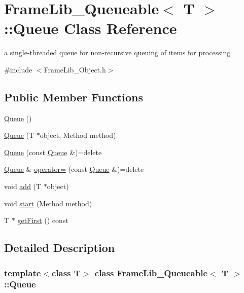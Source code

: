 \hypertarget{class_frame_lib___queueable_1_1_queue}{}\section{Frame\+Lib\+\_\+\+Queueable$<$ T $>$\+:\+:Queue Class Reference}
\label{class_frame_lib___queueable_1_1_queue}


a single-\/threaded queue for non-\/recursive queuing of items for processing  




{\ttfamily \#include $<$Frame\+Lib\+\_\+\+Object.\+h$>$}

\subsection*{Public Member Functions}
\begin{DoxyCompactItemize}
\item 
\hyperlink{class_frame_lib___queueable_1_1_queue_a5eb25b5751d5cc25331aa5e1b4fcb6ae}{Queue} ()
\item 
\hyperlink{class_frame_lib___queueable_1_1_queue_af701d261343c894ba4cde0aa8dd99bd1}{Queue} (T $\ast$object, Method method)
\item 
\hyperlink{class_frame_lib___queueable_1_1_queue_ae915c9e20e2c45cddb2fb2e502bae721}{Queue} (const \hyperlink{class_frame_lib___queueable_1_1_queue}{Queue} \&)=delete
\item 
\hyperlink{class_frame_lib___queueable_1_1_queue}{Queue} \& \hyperlink{class_frame_lib___queueable_1_1_queue_ad4185ad6feb21ba3cdc449274fc089db}{operator=} (const \hyperlink{class_frame_lib___queueable_1_1_queue}{Queue} \&)=delete
\item 
void \hyperlink{class_frame_lib___queueable_1_1_queue_ad53a3b731ae68fb92a3e0ea82687a1ce}{add} (T $\ast$object)
\item 
void \hyperlink{class_frame_lib___queueable_1_1_queue_a3fb4a73a39929ac3defbb98e3efdd363}{start} (Method method)
\item 
T $\ast$ \hyperlink{class_frame_lib___queueable_1_1_queue_a57e16be316a37b9b6d0d5cf7267e4d12}{get\+First} () const
\end{DoxyCompactItemize}


\subsection{Detailed Description}
\subsubsection*{template$<$class T$>$\newline
class Frame\+Lib\+\_\+\+Queueable$<$ T $>$\+::\+Queue}

